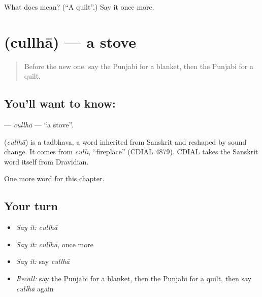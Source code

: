 \begin{tcolorbox}[breakable,colback=teal!4,colframe=teal!35!black,title={Before you move on}]
What does  mean? (\textquotedblleft{}A quilt\textquotedblright{}.) Say it once more.
\end{tcolorbox}
\section[\texorpdfstring{\pa{ਚੁੱਲ੍ਹਾ} (cullhā)}{ਚੁੱਲ੍ਹਾ (cullhā)}]{ (cullhā) — a stove}

\label{lesson:PA-C115-cullha}



\begin{quote}
Before the new one: say the Punjabi for a blanket, then the Punjabi for a quilt.
\end{quote}

\subsection*{You'll want to know: }
\textbf{} — \emph{cullhā} — \textquotedblleft{}a stove\textquotedblright{}.

\begin{cousinweb}
\textbf{} (\emph{cullhā}) is a tadbhava, a word inherited from Sanskrit and reshaped by sound change. It comes from \emph{cullī}, \textquotedblleft{}fireplace\textquotedblright{} (CDIAL 4879). CDIAL takes the Sanskrit word itself from Dravidian.
\end{cousinweb}

\begin{grammarlens}[title={What you've built}]
One more word for this chapter.
\end{grammarlens}

\subsection*{Your turn}
\begin{itemize}
\raggedright
  \item \emph{Say it:} \emph{cullhā}
  \item \emph{Say it:} \emph{cullhā}, once more
  \item \emph{Say it:} say \emph{cullhā}
  \item \emph{Recall:} say the Punjabi for a blanket, then the Punjabi for a quilt, then say \emph{cullhā} again
\end{itemize}

